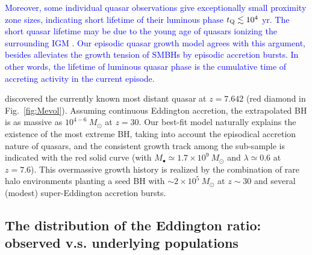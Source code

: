 \documentclass[twocolumn, twocolappendix]{aastex63}
\newcommand{\Msun}{M_\odot}
\newcommand{\red}[1]{\textcolor{red}{ #1}}
\newcommand{\blue}[1]{\textcolor{blue}{ #1}}
\begin{document}
\begin{CJK*}{UTF8}{gbsn}
\blue{
Moreover, some individual quasar observations give exceptionally small proximity zone sizes,
indicating short lifetime of their luminous phase $t_{\rm Q} \lesssim 10^4$ yr.
The short quasar lifetime may be due to the young age of quasars ionizing the surrounding IGM \citep[e.g.,][]{2020ApJ...903...60I,2021ApJ...917...38E}.
Our episodic quasar growth model agrees with this argument,
besides alleviates the growth tension of SMBHs by episodic accretion bursts.
In other words, the lifetime of luminous quasar phase is the cumulative time of accreting activity in the current episode.
}



\citet{2021ApJ...907L...1W} discovered the currently known most distant quasar at $z=7.642$ (red diamond in Fig.~\ref{fig:Mevol}).
Assuming continuous Eddington accretion, the extrapolated BH is as massive as $10^{4-6}~\Msun$ at $z= 30$. 
Our best-fit model naturally explains the existence of the most extreme BH,
taking into account the episodical accretion nature of quasars,
and the consistent growth track among the sub-sample is indicated with the red solid curve 
(with $M_\bullet \simeq 1.7\times 10^9~\Msun$ and $\lambda \simeq 0.6$ at $z=7.6$).
This overmassive growth history is realized by the combination of rare halo environments planting a seed BH 
with $\sim 2\times 10^5~\Msun$ at $z\sim 30$ and several (modest) super-Eddington accretion bursts.




\vspace{2mm}
\subsection{The distribution of the Eddington ratio: \\observed v.s. underlying populations}\label{sec:ldist}


\end{CJK*}
\end{document}
